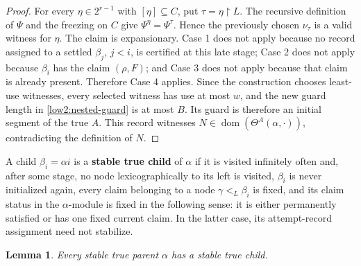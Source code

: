 \documentclass[10pt,a4paper]{amsart}
\newtheorem{lemma}[theorem]{Lemma}
\begin{document}
\begin{proof}
For every $\eta\in2^{r-1}$ with
$[\eta]\subseteq C$, put $\tau=\eta\upharpoonright L$. The recursive
definition of $\Psi$ and the freezing on $C$ give $\Psi^\eta=\Psi^\tau$.
Hence the previously chosen $\nu_\tau$ is a valid witness for $\eta$. The
claim is expansionary. Case 1 does not apply because no record assigned to a
settled $\beta_j$, $j<i$, is certified at this late stage; Case 2 does not
apply because $\beta_i$ has the claim $(\rho,F)$; and Case 3 does not apply
because that claim is already present. Therefore Case 4 applies. Since the
construction chooses least-use witnesses, every selected witness has use at
most $w$, and the new
guard length in \eqref{low2:nested-guard} is at most $B$. Its guard is
therefore an initial segment of the true $A$. This record witnesses $ N\in\operatorname{dom}(\Theta^A(\alpha,\cdot))$,
contradicting the definition of $N$.
\end{proof}

A child $\beta_i=\alpha i$ is a \textbf{stable true child} of $\alpha$ if it
is visited infinitely often and, after some stage, no node lexicographically
to its left is visited, $\beta_i$ is never initialized again, every claim
belonging to a node $\gamma<_L\beta_i$ is fixed, and its claim status in the
$\alpha$-module is fixed in the following sense: it is either permanently
satisfied or has one fixed current claim. In the latter case, its
attempt-record assignment need not stabilize.

\begin{lemma}\label{low2:true-child}
Every stable true parent $\alpha$ has a stable true child.
\end{lemma}
\end{document}
